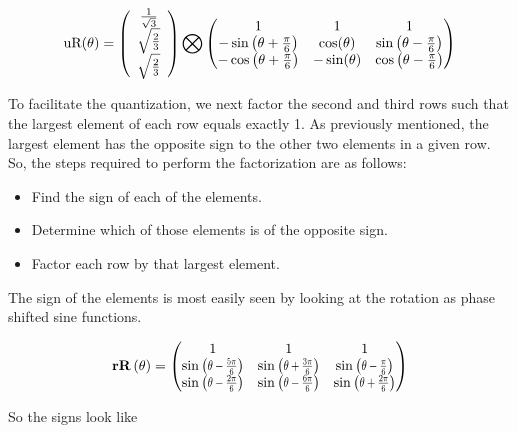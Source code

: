 \begin{equation}\label{eq:RotCommonFactors}
\text{uR}(\theta) =
\left(
\begin{array}{c}
 \frac{1}{\sqrt{3}} \\
 \sqrt{\frac{2}{3}}  \\
 \sqrt{\frac{2}{3}} \\
\end{array}
\right) \bigotimes
\begin{pmatrix}
 1 & 1 & 1 \\
 -\sin \left(\theta +\frac{\pi}{6}\right) &  \cos (\theta ) &  \sin \left(\theta -\frac{\pi}{6}\right) \\
 -\cos \left(\theta +\frac{\pi}{6}\right) & - \sin (\theta ) & \cos \left(\theta -\frac{\pi}{6}\right) \\
\end{pmatrix}
\end{equation}

To facilitate the quantization, we next factor the second and third rows such that the largest element of each row equals exactly 1. As previously mentioned, the largest element has the opposite sign to the other two elements in a given row. So, the steps required to perform the factorization are as follows:

\begin{itemize}
\item{Find the sign of each of the elements.}
\item{Determine which of those elements is of the opposite sign.}
\item{Factor each row by that largest element.}
\end{itemize}

The sign of the elements is most easily seen by looking at the rotation as phase shifted sine functions.

\begin{equation}\label{eq:RRot}
\rR[\theta]=
\begin{pmatrix}
 1 & 1 & 1 \\
 \sine{\theta -\frac{5 \pi }{6}}  & \sine{\theta +\frac{3 \pi }{6}}  & \sine{\theta -\Pii{6}}  \\
 \sine{\theta -\frac{2 \pi }{6}}  & \sine{\theta -\frac{6 \pi }{6}}  & \sine{\theta +\frac{2 \pi }{6}}  \\
\end{pmatrix}
\end{equation}

So the signs look like

